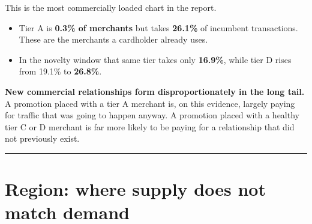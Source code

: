 \documentclass[
]{article}
\providecommand{\tightlist}{%
  \setlength{\itemsep}{0pt}\setlength{\parskip}{0pt}}
\begin{document}
This is the most commercially loaded chart in the report.

\begin{itemize}
\tightlist
\item
  Tier A is \textbf{0.3\% of merchants} but takes \textbf{26.1\%} of
  incumbent transactions. These are the merchants a cardholder already
  uses.
\item
  In the novelty window that same tier takes only \textbf{16.9\%}, while
  tier D rises from 19.1\% to \textbf{26.8\%}.
\end{itemize}

\textbf{New commercial relationships form disproportionately in the long
tail.} A promotion placed with a tier A merchant is, on this evidence,
largely paying for traffic that was going to happen anyway. A promotion
placed with a healthy tier C or D merchant is far more likely to be
paying for a relationship that did not previously exist.

\begin{center}\rule{0.5\linewidth}{0.5pt}\end{center}

\section{Region: where supply does not match
demand}\label{region-where-supply-does-not-match-demand}
\end{document}
